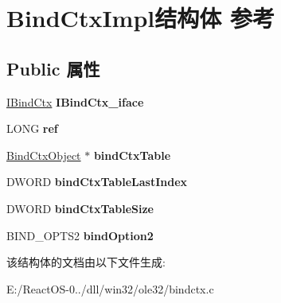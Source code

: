 \hypertarget{struct_bind_ctx_impl}{}\section{Bind\+Ctx\+Impl结构体 参考}
\label{struct_bind_ctx_impl}
\subsection*{Public 属性}
\begin{DoxyCompactItemize}
\item 
\mbox{\label{struct_bind_ctx_impl_a729f300623711e50b58f450dd3ace085}} 
\hyperlink{interface_i_bind_ctx}{I\+Bind\+Ctx} {\bfseries I\+Bind\+Ctx\+\_\+iface}
\item 
\mbox{\label{struct_bind_ctx_impl_abb6b7c0f940946b70b0a8665db2ae2a3}} 
L\+O\+NG {\bfseries ref}
\item 
\mbox{\label{struct_bind_ctx_impl_aa2d0b365787a4e27d31df4820339def5}} 
\hyperlink{struct_bind_ctx_object}{Bind\+Ctx\+Object} $\ast$ {\bfseries bind\+Ctx\+Table}
\item 
\mbox{\label{struct_bind_ctx_impl_a23c8d4815adbb039657aaec1a0ea8a97}} 
D\+W\+O\+RD {\bfseries bind\+Ctx\+Table\+Last\+Index}
\item 
\mbox{\label{struct_bind_ctx_impl_adfe158cc31fd012fe6743936adf34ce9}} 
D\+W\+O\+RD {\bfseries bind\+Ctx\+Table\+Size}
\item 
\mbox{\label{struct_bind_ctx_impl_ae16c2df2f85c150508132530fcce3158}} 
B\+I\+N\+D\+\_\+\+O\+P\+T\+S2 {\bfseries bind\+Option2}
\end{DoxyCompactItemize}


该结构体的文档由以下文件生成\+:\begin{DoxyCompactItemize}
\item 
E\+:/\+React\+O\+S-\/0../dll/win32/ole32/bindctx.\+c\end{DoxyCompactItemize}
